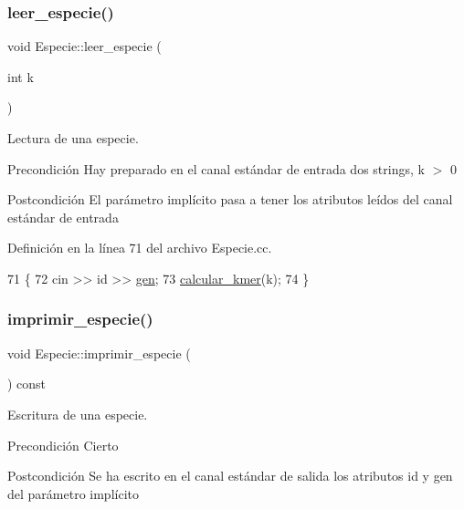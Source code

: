 \subsubsection{\texorpdfstring{leer\+\_\+especie()}{leer\_especie()}}
{\footnotesize\ttfamily void Especie\+::leer\+\_\+especie (\begin{DoxyParamCaption}\item[{int}]{k }\end{DoxyParamCaption})}



Lectura de una especie. 

\begin{DoxyPrecond}{Precondición}
Hay preparado en el canal estándar de entrada dos strings, k $>$ 0 
\end{DoxyPrecond}
\begin{DoxyPostcond}{Postcondición}
El parámetro implícito pasa a tener los atributos leídos del canal estándar de entrada 
\end{DoxyPostcond}


Definición en la línea 71 del archivo Especie.\+cc.


\begin{DoxyCode}
71                                 \{
72   cin >> \textcolor{keywordtype}{id} >> \hyperlink{class_especie_ac35bb565f7346cd6317b3a8c849456d1}{gen};
73   \hyperlink{class_especie_a83fdef791142b0887bfa7f45bd0d5e0e}{calcular\_kmer}(k);
74 \}
\end{DoxyCode}
\mbox{\label{class_especie_a8a0613c113fbdd5ff21627ddd6f11f44}} 
\subsubsection{\texorpdfstring{imprimir\+\_\+especie()}{imprimir\_especie()}}
{\footnotesize\ttfamily void Especie\+::imprimir\+\_\+especie (\begin{DoxyParamCaption}{ }\end{DoxyParamCaption}) const}



Escritura de una especie. 

\begin{DoxyPrecond}{Precondición}
Cierto 
\end{DoxyPrecond}
\begin{DoxyPostcond}{Postcondición}
Se ha escrito en el canal estándar de salida los atributos id y gen del parámetro implícito 
\end{DoxyPostcond}



